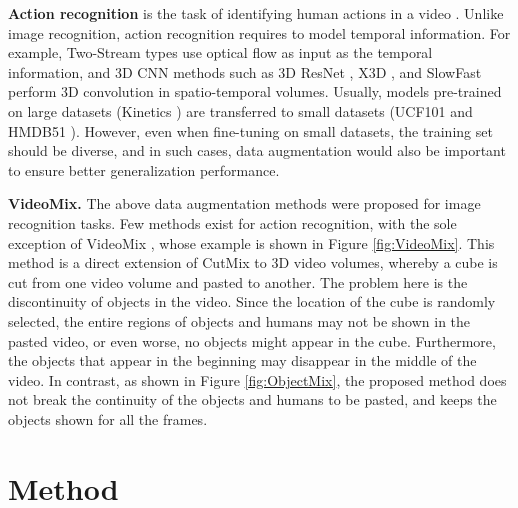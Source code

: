 \noindent\textbf{Action recognition} 
is the task of identifying human actions in a video \cite{Video_Action_Understanding2021}.
Unlike image recognition, action recognition requires to model temporal information.
For example, Two-Stream types \cite{TwoStream} use optical flow as input as the temporal information,
and 3D CNN methods such as
3D ResNet \cite{3Dresnet}, X3D \cite{X3D}, and SlowFast \cite{SlowFast}
perform 3D convolution in spatio-temporal volumes.
Usually, models pre-trained on large datasets (Kinetics \cite{DBLP:journals/corr/Kinetics})
are transferred to small datasets (UCF101 \cite{DBLP:ucf101} and HMDB51 \cite{wishart2018hmdb}).
However, even when fine-tuning on small datasets, the training set should be diverse,
and in such cases,
data augmentation would also be important to ensure better generalization performance.


\noindent\textbf{VideoMix.}
The above data augmentation methods were proposed for image recognition tasks.
Few methods exist for action recognition, with the sole exception of VideoMix \cite{VideoMix},
whose example is shown in Figure \ref{fig:VideoMix}.
This method is a direct extension of CutMix \cite{Yun_2019_ICCV} to 3D video volumes,
whereby a cube is cut from one video volume and pasted to another.
The problem here is the discontinuity of objects in the video.
Since the location of the cube is randomly selected,
the entire regions of objects and humans may not be shown in the pasted video,
or even worse, no objects might appear in the cube.
Furthermore, the objects that appear in the beginning may disappear in the middle of the video.
In contrast, as shown in Figure \ref{fig:ObjectMix},
the proposed method does not break the continuity of the objects and humans to be pasted,
and keeps the objects shown for all the frames.














\section{Method}

